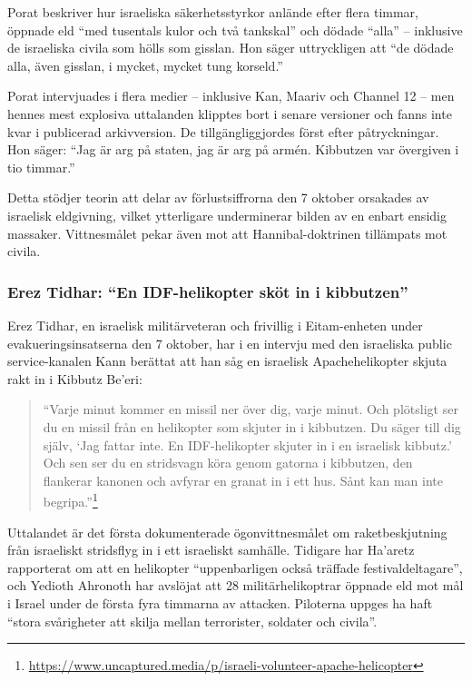 \documentclass[12pt]{article}
\begin{document}
Porat beskriver hur israeliska säkerhetsstyrkor anlände efter flera timmar, öppnade eld “med tusentals kulor och två tankskal” och dödade “alla” – inklusive de israeliska civila som hölls som gisslan. Hon säger uttryckligen att “de dödade alla, även gisslan, i mycket, mycket tung korseld.”

Porat intervjuades i flera medier – inklusive Kan, Maariv och Channel 12 – men hennes mest explosiva uttalanden klipptes bort i senare versioner och fanns inte kvar i publicerad arkivversion. De tillgängliggjordes först efter påtryckningar. Hon säger: “Jag är arg på staten, jag är arg på armén. Kibbutzen var övergiven i tio timmar.” 

Detta stödjer teorin att delar av förlustsiffrorna den 7 oktober orsakades av israelisk eldgivning, vilket ytterligare underminerar bilden av en enbart ensidig massaker. Vittnesmålet pekar även mot att Hannibal-doktrinen tillämpats mot civila.

\subsubsection*{Erez Tidhar: “En IDF-helikopter sköt in i kibbutzen”}

Erez Tidhar, en israelisk militärveteran och frivillig i Eitam-enheten under evakueringsinsatserna den 7 oktober, har i en intervju med den israeliska public service-kanalen Kann berättat att han såg en israelisk Apachehelikopter skjuta rakt in i Kibbutz Be’eri:

\begin{quote}
“Varje minut kommer en missil ner över dig, varje minut. Och plötsligt ser du en missil från en helikopter som skjuter in i kibbutzen. Du säger till dig själv, ‘Jag fattar inte. En IDF-helikopter skjuter in i en israelisk kibbutz.’ Och sen ser du en stridsvagn köra genom gatorna i kibbutzen, den flankerar kanonen och avfyrar en granat in i ett hus. Sånt kan man inte begripa.”\footnote{\url{https://www.uncaptured.media/p/israeli-volunteer-apache-helicopter}}
\end{quote}

Uttalandet är det första dokumenterade ögonvittnesmålet om raketbeskjutning från israeliskt stridsflyg in i ett israeliskt samhälle. Tidigare har Ha’aretz rapporterat om att en helikopter “uppenbarligen också träffade festivaldeltagare”, och Yedioth Ahronoth har avslöjat att 28 militärhelikoptrar öppnade eld mot mål i Israel under de första fyra timmarna av attacken. Piloterna uppges ha haft “stora svårigheter att skilja mellan terrorister, soldater och civila”.
\end{document}
